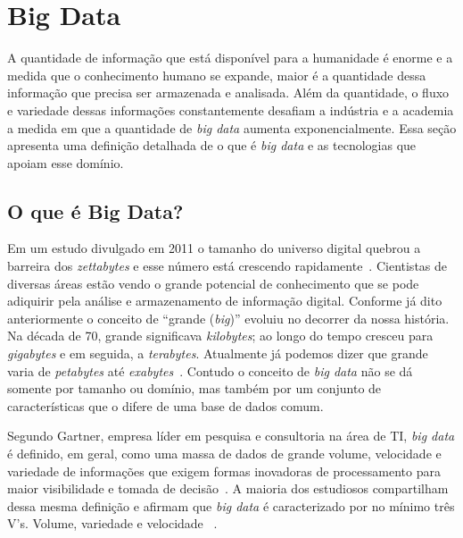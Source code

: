 \section{Big Data}


A quantidade de informação que está disponível para a humanidade é enorme e a medida que o conhecimento humano se expande, maior é a quantidade dessa informação que precisa ser armazenada e analisada. Além da quantidade, o fluxo e variedade dessas informações constantemente desafiam a indústria e a academia a medida em que a quantidade de \textit{big  data} aumenta exponencialmente. Essa seção apresenta uma definição detalhada de o que é \textit{big data} e as tecnologias que apoiam esse domínio.

\subsection{O que é Big Data?}

Em um estudo divulgado em 2011 o tamanho do universo digital quebrou a barreira dos \textit{zettabytes} e esse número está crescendo rapidamente~\cite{emcuniversedigital}. Cientistas de diversas áreas estão vendo o grande potencial de conhecimento que se pode adiquirir pela análise e armazenamento de informação digital. Conforme já dito anteriormente o conceito de ``grande (\textit{big})''  evoluiu no decorrer da nossa história. Na década de 70, grande significava \emph{kilobytes}; ao longo do tempo cresceu para \emph{gigabytes} e em seguida, a \emph{terabytes}. Atualmente já podemos dizer que grande varia de \emph{petabytes}  até \emph{exabytes}~\cite{WNextBigData}. Contudo  o  conceito de \textit{big data} não se dá somente por tamanho ou domínio, mas também por um conjunto de características que o difere de uma base de dados comum.

Segundo Gartner, empresa líder em pesquisa e consultoria na área de TI, \emph{big data} é definido, em geral, como uma massa de dados de grande volume, velocidade e variedade de informações que exigem formas inovadoras de processamento para maior visibilidade e tomada de decisão~\cite{conceitoGartner}. A maioria dos estudiosos compartilham dessa mesma definição e afirmam que \textit{big data} é caracterizado por no mínimo três V's. Volume, variedade e  velocidade ~\cite{ibmbigdatavvv,fromdbtobigdata}.

